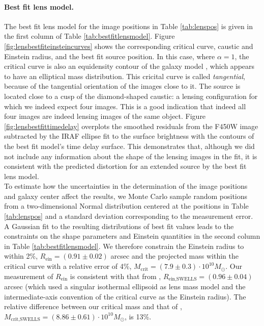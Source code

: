 \paragraph{Best fit lens model.} The best fit lens model for the image positions in Table \ref{tab:lenspos} is given in the first column of Table \ref{tab:bestfitlensmodel}. Figure \ref{fig:lensbestfiteinsteincurves} shows the corresponding critical curve, caustic and Einstein radius, and the best fit source position. In this case, where $\alpha=1$, the critical curve is also an equidensity contour of the galaxy model \citep{EvansWitt}, which appears to have an elliptical mass distribution. This cricital curve is called \emph{tangential}, because of the tangential orientation of the images close to it. The source is located close to a cusp of the diamond-shaped caustic: a lensing configuration for which we indeed expect four images. This is a good indication that indeed all four images are indeed lensing images of the same object. Figure \ref{fig:lensbestfittimedelay} overplots the smoothed residuals from the F450W image subtracted by the IRAF ellipse fit to the surface brightness with the contours of the best fit model's time delay surface. This demonstrates that, although we did not include any information about the shape of the lensing images in the fit, it is consistent with the predicted distortion for an extended source by the best fit lens model.
\\To estimate how the uncertainties in the determination of the image positions and galaxy center affect the results, we Monte Carlo sample random positions from a two-dimensional Normal distribution centered at the positions in Table \ref{tab:lenspos} and a standard deviation corresponding to the measurement error. A Gaussian fit to the resulting distributions of best fit values leads to the constraints on the shape parameters and Einstein quantities in the second column in Table \ref{tab:bestfitlensmodel}. We therefore constrain the Einstein radius to within 2\%, $R_\text{ein} = (0.91 \pm 0.02)$ arcsec and the projected mass within the critical curve with a relative error of 4\%, $M_\text{crit} =(7.9\pm0.3)\cdot 10^{10} M_\odot$. Our measurement of $R_\text{ein}$ is consistent with that from \citet{SWELLSIII}, $R_\text{ein,SWELLS} = (0.96 \pm 0.04)$ arcsec (which used a singular isothermal ellipsoid as lens mass model and the intermediate-axis convention of the critical curve as the Einstein radius). The relative difference between our critical mass and that of \citet{SWELLSIII}, $M_\text{crit,SWELLS} =(8.86\pm0.61)\cdot 10^{10} M_\odot$, is 13\%.

